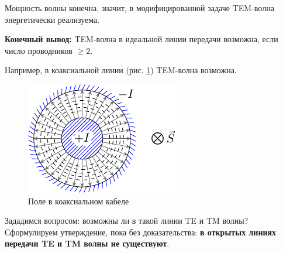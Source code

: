 Мощность волны конечна, значит, в модифицированной задаче TEM-волна энергетически реализуема.

\textbf{Конечный вывод:} TEM-волна в идеальной линии передачи возможна, если число проводников $\geq 2$.

Например, в коаксиальной линии (рис. \ref{fig:lect4:6}) TEM-волна возможна.

\begin{figure}[h!]
	\centering
	\includegraphics[scale=1.5]{img/lect4_ris6}
	\caption{Поле в коаксиальном кабеле}
	\label{fig:lect4:6}
\end{figure}

Зададимся вопросом: возможны ли в такой линии TE и TM волны? Сформулируем утверждение, пока без доказательства:
\textbf{в открытых линиях передачи TE и TM волны не существуют}.
